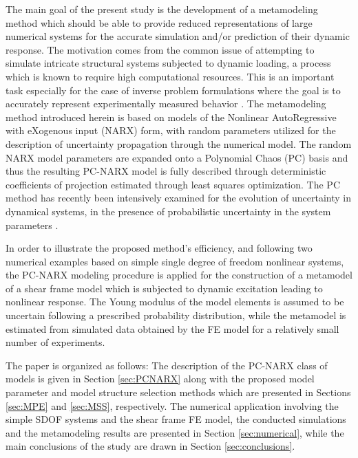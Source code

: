 \documentclass[preprint,3p,review,times,11pt]{elsarticle}
\begin{document}
The main goal of the present study is the development of a metamodeling method which should be able to provide reduced representations of large numerical systems for the accurate simulation and/or prediction of their dynamic response. The motivation comes from the common issue of attempting to simulate intricate structural systems subjected to dynamic loading, a process which is known to require high computational resources. This is an important task especially for the case of inverse problem formulations where the goal is to accurately represent experimentally measured behavior \cite{Fuggini-etal2011}. The metamodeling method introduced herein is based on models of the Nonlinear AutoRegressive with eXogenous input (NARX) form, with random parameters utilized for the description of uncertainty propagation through the numerical model. The random NARX model parameters are expanded onto a Polynomial Chaos (PC) basis and thus the resulting PC-NARX model is fully described through deterministic coefficients of projection estimated through least squares optimization. The PC method has recently been intensively examined for the evolution of uncertainty in dynamical systems, in the presence of probabilistic uncertainty in the system parameters \cite{Li-Ghanem1998, Sapsis-Lermusiaux2012, Gerritsma-etal2012}.

In order to illustrate the proposed method's efficiency, and following two numerical examples based on simple single degree of freedom nonlinear systems, the PC-NARX modeling procedure is applied for the construction of a metamodel of a shear frame model which is subjected to dynamic excitation leading to nonlinear response. The Young modulus of the model elements is assumed to be uncertain following a prescribed probability distribution, while the metamodel is estimated from simulated data obtained by the FE model for a relatively small number of experiments.  

The paper is organized as follows: The description of the PC-NARX class of models is given in Section \ref{sec:PCNARX} along with the proposed model parameter and model structure selection methods which are presented in Sections \ref{sec:MPE} and \ref{sec:MSS}, respectively. The numerical application involving the simple SDOF systems and the shear frame FE model, the conducted simulations and the metamodeling results are presented in Section \ref{sec:numerical}, while the main conclusions of the study are drawn in Section \ref{sec:conclusions}.


\end{document}
